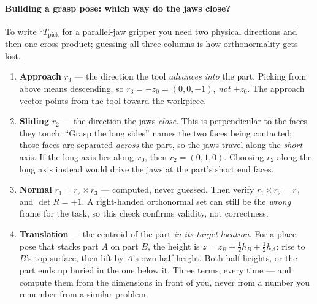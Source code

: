 \documentclass[11pt,a4paper]{article}
\begin{document}
\paragraph{Building a grasp pose: which way do the jaws close?}
To write ${}^0T_{\text{pick}}$ for a parallel-jaw gripper you need two physical directions and then
one cross product; guessing all three columns is how orthonormality gets lost.
\begin{enumerate}
\item \textbf{Approach} $r_3$ --- the direction the tool \emph{advances into} the part. Picking
      from above means descending, so $r_3=-z_0=(0,0,-1)$, \emph{not} $+z_0$. The approach vector
      points from the tool toward the workpiece.
\item \textbf{Sliding} $r_2$ --- the direction the jaws \emph{close}. This is perpendicular to the
      faces they touch. ``Grasp the long sides'' names the two faces being contacted; those faces
      are separated \emph{across} the part, so the jaws travel along the \emph{short} axis. If the
      long axis lies along $x_0$, then $r_2=(0,1,0)$. Choosing $r_2$ along the long axis instead
      would drive the jaws at the part's short end faces.
\item \textbf{Normal} $r_1=r_2\times r_3$ --- computed, never guessed. Then verify
      $r_1\times r_2=r_3$ and $\det R=+1$. A right-handed orthonormal set can still be the
      \emph{wrong} frame for the task, so this check confirms validity, not correctness.
\item \textbf{Translation} --- the centroid of the part \emph{in its target location}. For a place
      pose that stacks part $A$ on part $B$, the height is
      $z = z_B + \tfrac12 h_B + \tfrac12 h_A$: rise to $B$'s top surface, then lift by $A$'s own
      half-height. Both half-heights, or the part ends up buried in the one below it. Three terms,
      every time --- and compute them from the dimensions in front of you, never from a number you
      remember from a similar problem.
\end{enumerate}
\end{document}
